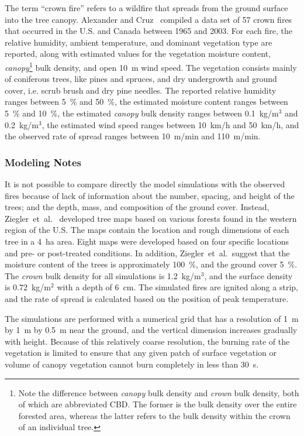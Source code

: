 The term ``crown fire'' refers to a wildfire that spreads from the ground surface into the tree canopy. Alexander and Cruz~\cite{Alexander:CJFR2006} compiled a data set of 57 crown fires that occurred in the U.S. and Canada between 1965 and 2003. For each fire, the relative humidity, ambient temperature, and dominant vegetation type are reported, along with estimated values for the vegetation moisture content, {\em canopy}\footnote{Note the difference between {\em canopy} bulk density and {\em crown} bulk density, both of which are abbreviated CBD. The former is the bulk density over the entire forested area, whereas the latter refers to the bulk density within the crown of an individual tree.} bulk density, and open 10~m wind speed. The vegetation consists mainly of coniferous trees, like pines and spruces, and dry undergrowth and ground cover, i.e. scrub brush and dry pine needles. The reported relative humidity ranges between 5~\% and 50~\%, the estimated moisture content ranges between 5~\% and 10~\%, the estimated {\em canopy} bulk density ranges between 0.1~kg/m$^3$ and 0.2~kg/m$^3$, the estimated wind speed ranges between 10~km/h and 50~km/h, and the observed rate of spread ranges between 10~m/min and 110~m/min.

\subsubsection{Modeling Notes}

It is not possible to compare directly the model simulations with the observed fires because of lack of information about the number, spacing, and height of the trees; and the depth, mass, and composition of the ground cover. Instead, Ziegler~et~al.~\cite{Ziegler:thesis,Ziegler:FEM2017,Ziegler:Data2019,Hoffman:FT2016} developed tree maps based on various forests found in the western region of the U.S. The maps contain the location and rough dimensions of each tree in a 4~ha area. Eight maps were developed based on four specific locations and pre- or post-treated conditions. In addition, Ziegler~et~al.~suggest that the moisture content of the trees is approximately 100~\%, and the ground cover 5~\%. The {\em crown} bulk density for all simulations is 1.2~kg/m$^3$, and the surface density is 0.72~kg/m$^2$ with a depth of 6~cm. The simulated fires are ignited along a strip, and the rate of spread is calculated based on the position of peak temperature.

The simulations are performed with a numerical grid that has a resolution of 1~m by 1~m by 0.5~m near the ground, and the vertical dimension increases gradually with height. Because of this relatively coarse resolution, the burning rate of the vegetation is limited to ensure that any given patch of surface vegetation or volume of canopy vegetation cannot burn completely in less than 30~s.





